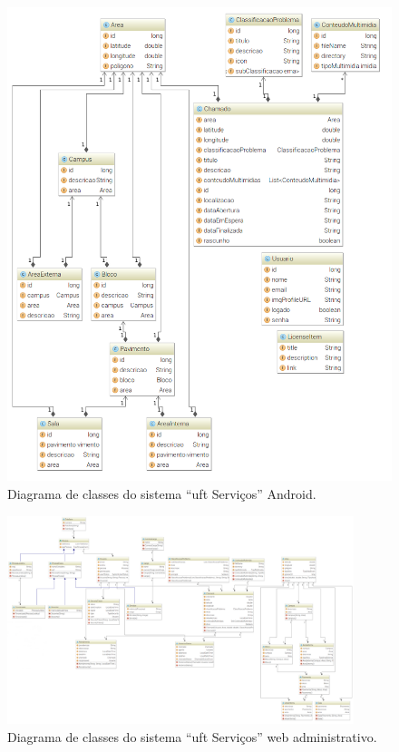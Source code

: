 \begin{figure}[H]
 \centering
 \includegraphics[angle=270, width=1\textwidth]{figuras/uft-servicos-android-diagram} 
 \caption{Diagrama de classes do sistema ``\acrshort{uft} Serviços'' Android.}
 \label{diagram-android} 
\end{figure}

\begin{figure}[H]
 \centering
 \includegraphics[angle=270, width=0.9\textwidth]{figuras/uft-servicos-diagram} 
 \caption{Diagrama de classes do sistema ``\acrshort{uft} Serviços'' web administrativo.}
 \label{diagram-web} 
\end{figure}

